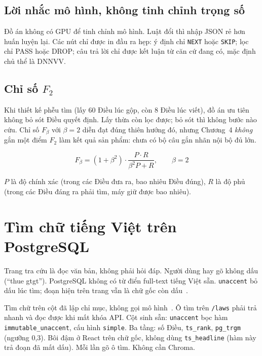 \subsection{Lời nhắc mô hình, không tinh chỉnh trọng số}

Đồ án không có GPU để tinh chỉnh mô hình. Luật đổi thì nhập JSON rẻ hơn huấn
luyện lại. Các nút chỉ được in đầu ra hẹp: ý định chỉ \texttt{NEXT} hoặc
\texttt{SKIP}; lọc chỉ PASS hoặc DROP; câu trả lời chỉ được kết luận từ căn cứ
đang có, mặc định chủ thể là DNNVV.

\subsection{Chỉ số $F_2$}

Khi thiết kế phễu tìm (lấy 60 Điều lúc gộp, còn 8 Điều lúc viết), đồ án ưu tiên
không bỏ sót Điều quyết định. Lấy thừa còn lọc được; bỏ sót thì không bước nào
cứu. Chỉ số $F_\beta$ với $\beta=2$ diễn đạt đúng thiên hướng đó, nhưng Chương~4
\emph{không} gắn một điểm $F_2$ làm kết quả sản phẩm: chưa có bộ câu gắn nhãn
nội bộ đủ lớn.

\begin{equation}
\label{eq:fbeta}
F_\beta = (1 + \beta^2) \cdot \frac{P \cdot R}{\beta^2 P + R},\qquad \beta = 2
\end{equation}

$P$ là độ chính xác (trong các Điều đưa ra, bao nhiêu Điều đúng), $R$ là độ phủ
(trong các Điều đáng ra phải tìm, máy giữ được bao nhiêu).

\section{Tìm chữ tiếng Việt trên PostgreSQL}

Trang tra cứu là đọc văn bản, không phải hỏi đáp. Người dùng hay gõ không dấu
(``thue gtgt''). PostgreSQL không có từ điển full-text tiếng Việt sẵn.
\texttt{unaccent} bỏ dấu lúc tìm; đoạn hiện trên trang vẫn là chữ gốc còn
dấu~\cite{postgresqlfts}.

\boncau
{Tìm chữ trên cột đã lập chỉ mục, không gọi mô hình~\cite{postgresqlfts}.}
{Ô tìm trên \texttt{/laws} phải trả nhanh và đọc được khi mất khóa API.}
{Cột sinh sẵn: \texttt{unaccent} bọc hàm \texttt{immutable\_unaccent}, cấu hình
\texttt{simple}. Ba tầng: số Điều, \texttt{ts\_rank}, \texttt{pg\_trgm} (ngưỡng
0,3). Bôi đậm ở React trên chữ gốc, không dùng \texttt{ts\_headline} (hàm này
trả đoạn đã mất dấu).}
{Mỗi lần gõ ô tìm. Không cần Chroma.}

